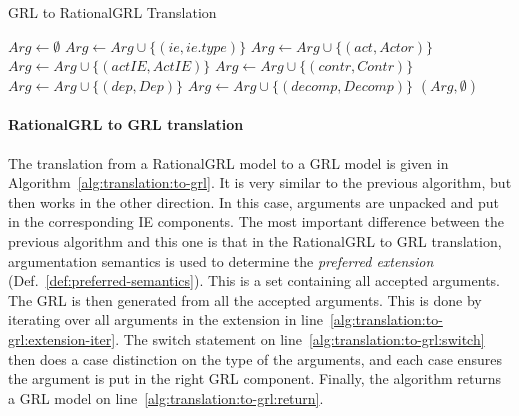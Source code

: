 \begin{algorithm}[h]
  \caption{GRL to RationalGRL Translation}
  \label{alg:translation:to-rationalgrl}
  \begin{algorithmic}[1]
    \State $Arg \leftarrow \emptyset$\label{alg:translation:to-rationalgrl:init}
    \label{alg:translation:to-rationalgrl:ie}
      \State $Arg \leftarrow Arg \cup \{(ie,ie.type)\}$
    \EndFor
      \State $Arg \leftarrow Arg \cup \{(act, Actor)\}$
    \EndFor
      \State $Arg \leftarrow Arg \cup \{(actIE, ActIE)\}$
    \EndFor
      \State $Arg \leftarrow Arg \cup \{(contr, Contr)\}$
    \EndFor
      \State $Arg \leftarrow Arg \cup \{(dep, Dep)\}$
    \EndFor
      \State $Arg \leftarrow Arg \cup \{(decomp, Decomp)\}$
    \EndFor
    \State \Return $(Arg, \emptyset)$\label{alg:translation:to-rationalgrl:return}
    \EndProcedure
  \end{algorithmic}
\end{algorithm}

\paragraph{RationalGRL to GRL translation} The translation from a RationalGRL model to a GRL model is given in Algorithm~\ref{alg:translation:to-grl}. It is very similar to the previous algorithm, but then works in the other direction. In this case, arguments are unpacked and put in the corresponding IE components. The most important difference between the previous algorithm and this one is that in the RationalGRL to GRL translation, argumentation semantics is used to determine the \emph{preferred extension} (Def.~\ref{def:preferred-semantics}). This is a set containing all accepted arguments. The GRL is then generated from all the accepted arguments. This is done by iterating over all arguments in the extension in line~\ref{alg:translation:to-grl:extension-iter}. The switch statement on line~\ref{alg:translation:to-grl:switch} then does a case distinction on the type of the arguments, and each case ensures the argument is put in the right GRL component. Finally, the algorithm returns a GRL model on line~\ref{alg:translation:to-grl:return}.


